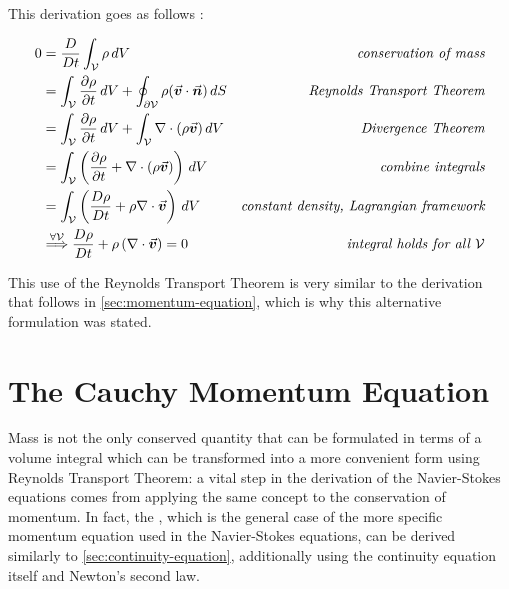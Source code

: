 This derivation goes as follows \autocite*{continuum-intro}:

\begin{align}
    0 & = \frac{D}{Dt} \int_\mathcal{V}\rho\,dV                                                                                & \textit{conservation of mass}                   \\
      & = \int_\mathcal{V} \frac{\partial\rho}{\partial t} \,dV + \oint_{\partial \mathcal{V}} \rho (\vec{\bm{v}}\cdot\vec{\bm{n}}) \,dS & \textit{Reynolds Transport Theorem}             \\
      & = \int_\mathcal{V} \frac{\partial\rho}{\partial t} \,dV + \int_{\mathcal{V}} \nabla \cdot (\rho \vec{\bm{v}}) \,dV          & \textit{Divergence Theorem}                     \\
      & = \int_\mathcal{V} \left(\frac{\partial\rho}{\partial t} + \nabla \cdot (\rho \vec{\bm{v}})\right) \,dV                     & \textit{combine integrals}                      \\
      & = \int_\mathcal{V} \left(\frac{D\rho}{D t} + \rho \nabla \cdot  \vec{\bm{v}}\right) \,dV                                    & \textit{constant density, Lagrangian framework} \\
      & \overset{\forall\mathcal{V}}{\Longrightarrow} \frac{D\rho}{D t} + \rho \left(\nabla \cdot  \vec{\bm{v}}\right) = 0          & \textit{integral holds for all $\mathcal{V}$}
\end{align}

This use of the Reynolds Transport Theorem is very similar to the derivation that follows in \autoref{sec:momentum-equation}, which is why this alternative formulation was stated.

\section{The Cauchy Momentum Equation}\label{sec:momentum-equation}

Mass is not the only conserved quantity that can be formulated in terms of a volume integral which can be transformed into a more convenient form using Reynolds Transport Theorem: a vital step in the derivation of the Navier-Stokes equations comes from applying the same concept to the conservation of momentum. In fact, the , which is the general case of the more specific momentum equation used in the Navier-Stokes equations, can be derived similarly to \autoref{sec:continuity-equation}, additionally using the continuity equation itself and Newton's second law.


